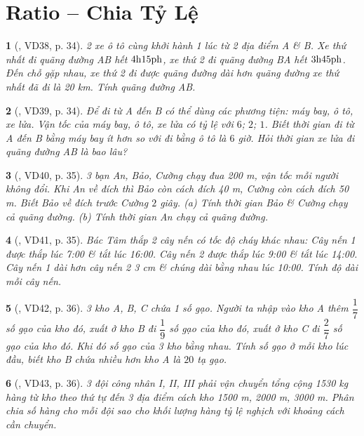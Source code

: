 \documentclass{article}
\newtheorem{baitoan}{}
\begin{document}
\section{Ratio -- Chia Tỷ Lệ}

\begin{baitoan}[\cite{Binh_Toan_7_tap_1}, VD38, p. 34]
	2 xe ô tô cùng khởi hành 1 lúc từ 2 địa điểm A \& B. Xe thứ nhất đi quãng đường AB hết $\rm4h15ph$, xe thứ 2 đi quãng đường BA hết $\rm3h45ph$. Đến chỗ gặp nhau, xe thứ 2 đi được quãng đường dài hơn quãng đường xe thứ nhất đã đi là {\rm20 km}. Tính quãng đường AB.
\end{baitoan}

\begin{baitoan}[\cite{Binh_Toan_7_tap_1}, VD39, p. 34]
	Để đi từ A đến B có thể dùng các phương tiện: máy bay, ô tô, xe lửa. Vận tốc của máy bay, ô tô, xe lửa có tỷ lệ với $6$; $2$; $1$. Biết thời gian đi từ A đến B bằng máy bay ít hơn so với đi bằng ô tô là $6$ giờ. Hỏi thời gian xe lửa đi quãng đường AB là bao lâu?
\end{baitoan}

\begin{baitoan}[\cite{Binh_Toan_7_tap_1}, VD40, p. 35]
	3 bạn An, Bảo, Cường chạy đua {\rm200 m}, vận tốc mỗi người không đổi. Khi An về đích thì Bảo còn cách đích {\rm40 m}, Cường còn cách đích {\rm50 m}. Biết Bảo về đích trước Cường $2$ giây. (a) Tính thời gian Bảo \& Cường chạy cả quãng đường. (b) Tính thời gian An chạy cả quãng đường.
\end{baitoan}

\begin{baitoan}[\cite{Binh_Toan_7_tap_1}, VD41, p. 35]
	Bác Tâm thắp 2 cây nến có tốc độ cháy khác nhau: Cây nến 1 được thắp lúc {\rm7:00} \& tắt lúc {\rm16:00}. Cây nến 2 được thắp lúc {\rm9:00} \& tắt lúc {\rm14:00}. Cây nến 1 dài hơn cây nến 2 {\rm3 cm} \& chúng dài bằng nhau lúc {\rm10:00}. Tính độ dài mỗi cây nến.
\end{baitoan}

\begin{baitoan}[\cite{Binh_Toan_7_tap_1}, VD42, p. 36]
	3 kho A, B, C chứa 1 số gạo. Người ta nhập vào kho A thêm $\dfrac{1}{7}$ số gạo của kho đó, xuất ở kho B đi $\dfrac{1}{9}$ số gạo của kho đó, xuất ở kho C đi $\dfrac{2}{7}$ số gạo của kho đó. Khi đó số gạo của 3 kho bằng nhau. Tính số gạo ở mỗi kho lúc đầu, biết kho B chứa nhiều hơn kho A là $20$ tạ gạo.
\end{baitoan}

\begin{baitoan}[\cite{Binh_Toan_7_tap_1}, VD43, p. 36]
	3 đội công nhân I, II, III phải vận chuyển tổng cộng {\rm1530 kg} hàng từ kho theo thứ tự đến 3 địa điểm cách kho {\rm1500 m, 2000 m, 3000 m}. Phân chia số hàng cho mỗi đội sao cho khối lượng hàng tỷ lệ nghịch với khoảng cách cần chuyển.
\end{baitoan}
\end{document}
